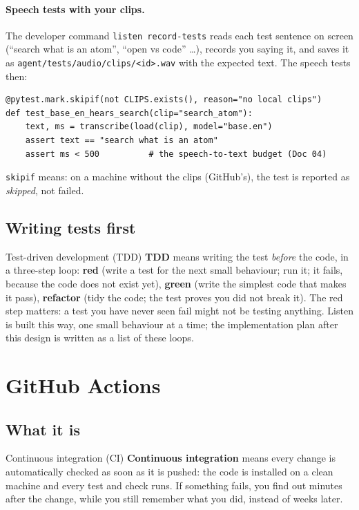 \documentclass[11pt,a4paper]{article}
\begin{document}
\paragraph{Speech tests with your clips.} The developer command \texttt{listen record-tests}
reads each test sentence on screen (``search what is an atom'', ``open vs code'' \ldots), records
you saying it, and saves it as \texttt{agent/tests/audio/clips/<id>.wav} with the expected text.
The speech tests then:
\begin{lstlisting}
@pytest.mark.skipif(not CLIPS.exists(), reason="no local clips")
def test_base_en_hears_search(clip="search_atom"):
    text, ms = transcribe(load(clip), model="base.en")
    assert text == "search what is an atom"
    assert ms < 500          # the speech-to-text budget (Doc 04)
\end{lstlisting}
\noindent \texttt{skipif} means: on a machine without the clips (GitHub's), the test is reported
as \emph{skipped}, not failed.

\subsection{Writing tests first}
\begin{concept}{Test-driven development (TDD)}
\textbf{TDD} means writing the test \emph{before} the code, in a three-step loop:
\textbf{red} (write a test for the next small behaviour; run it; it fails, because the code does
not exist yet), \textbf{green} (write the simplest code that makes it pass), \textbf{refactor}
(tidy the code; the test proves you did not break it). The red step matters: a test you have
never seen fail might not be testing anything. Listen is built this way, one small behaviour at a
time; the implementation plan after this design is written as a list of these loops.
\end{concept}

\section{GitHub Actions}

\subsection{What it is}
\begin{concept}{Continuous integration (CI)}
\textbf{Continuous integration} means every change is automatically checked as soon as it is
pushed: the code is installed on a clean machine and every test and check runs. If something
fails, you find out minutes after the change, while you still remember what you did, instead of
weeks later.
\end{concept}
\end{document}

